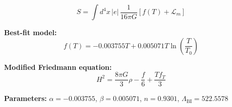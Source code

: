
\begin{equation}
  S = \int d^4x \, |e| \, \frac{1}{16\pi G} \left[ f(T) + \mathcal{L}_m \right]
\end{equation}

\textbf{Best-fit model:}
\begin{equation}
  f(T) = -0.003755 T + 0.005071 T \ln\!\left(\frac{T}{T_0}\right)
\end{equation}

\textbf{Modified Friedmann equation:}
\begin{equation}
  H^2 = \frac{8\pi G}{3} \rho - \frac{f}{6} + \frac{T f_T}{3}
\end{equation}

\textbf{Parameters:}
$\alpha = -0.003755$, \quad
$\beta = 0.005071$, \quad
$n = 0.9301$, \quad
$\Lambda_{\text{BI}} = 522.5578$